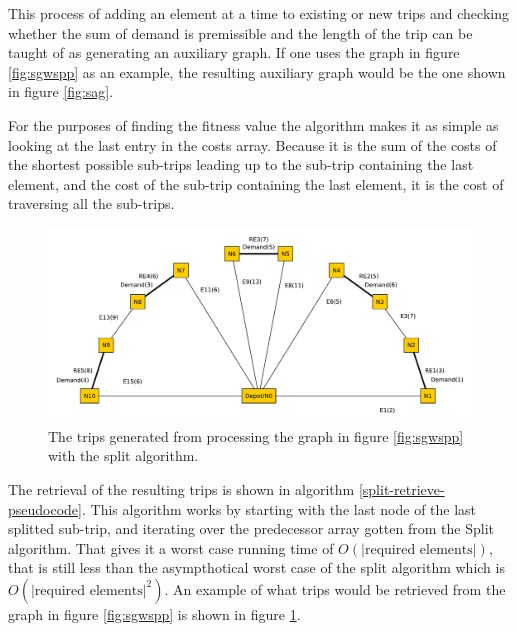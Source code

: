 This process of adding an element at a time to existing or new trips and checking whether the sum of demand is premissible and the length of the trip can be taught of as generating an auxiliary graph. If one uses the graph in figure \ref{fig:sgwspp} as an example, the resulting auxiliary graph would be the one shown in figure \ref{fig:sag}.

For the purposes of finding the fitness value the algorithm makes it as  simple as looking at the last entry in the costs array. Because it is the sum of the costs of the shortest possible sub-trips leading up to the sub-trip containing the last element, and the cost of the sub-trip containing the last element, it is the cost of traversing all the sub-trips.

\begin{figure}[thbp]
    \centerline{\includegraphics[width=\textwidth]{figures/SplitIllustrations/Split_GraphWithRoutes.pdf}}
    \caption{The trips generated from processing the graph in figure \ref{fig:sgwspp} with the split algorithm.}
    \label{fig:sgwr}
\end{figure}

The retrieval of the resulting trips is shown in algorithm \ref{split-retrieve-pseudocode}. This algorithm works by starting with the last node of the last splitted sub-trip, and iterating over the predecessor array gotten from the Split algorithm. That gives it a worst case running time of $O(|\text{required elements}|)$, that is still less than the asympthotical worst case of the split algorithm which is $O(|\text{required elements}|^2)$. An example of what trips would be retrieved from the graph in figure \ref{fig:sgwspp} is shown in figure \ref{fig:sgwr}.


